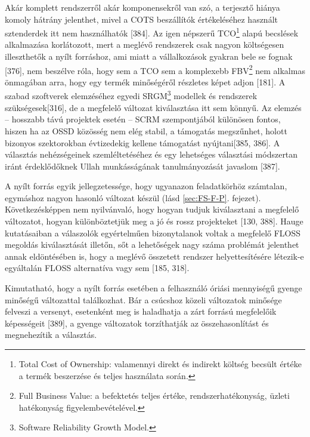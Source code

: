 \documentclass[12pt,magyar,a4paper,oneside]{scrreprt}
\begin{document}
Akár komplett rendszerről akár komponensekről van szó, a terjesztő
hiánya komoly hátrány jelenthet, mivel a COTS beszállítók értékeléséhez
használt sztenderdek itt nem használhatók {[}384{]}. Az igen népszerű
TCO\footnote{Total Cost of Ownership: valamennyi direkt és indirekt
  költség becsült értéke a termék beszerzése és teljes használata során.}
alapú becslések alkalmazása korlátozott, mert a meglévő rendszerek csak
nagyon költségesen illeszthetők a nyílt forráshoz, ami miatt a
vállalkozások gyakran bele se fognak {[}376{]}, nem beszélve róla, hogy
sem a TCO sem a komplexebb FBV\footnote{Full Business Value: a
  befektetés teljes értéke, rendszerhatékonyság, üzleti hatékonyság
  figyelembevételével.} nem alkalmas önmagában arra, hogy egy termék
minőségéről részletes képet adjon {[}181{]}. A szabad szoftverek
elemzéséhez egyedi SRGM\footnote{Software Reliability Growth Model.}
modellek és rendszerek szükségesek{[}316{]}, de a megfelelő változat
kiválasztása itt sem könnyű. Az elemzés -- hosszabb távú projektek
esetén -- SCRM szempontjából különösen fontos, hiszen ha az OSSD
közösség nem elég stabil, a támogatás megszűnhet, holott bizonyos
szektorokban évtizedekig kellene támogatást nyújtani{[}385, 386{]}. A
választás nehézségeinek szemléltetéséhez és egy lehetséges választási
módszertan iránt érdeklődőknek Ullah munkásságának tanulmányozását
javaslom {[}387{]}.

A nyílt forrás egyik jellegzetessége, hogy ugyanazon feladatkörhöz
számtalan, egymáshoz nagyon hasonló változat készül (lásd
\ref{sec:FS-F-P}. fejezet). Következésképpen nem nyilvánvaló, hogy
hogyan tudjuk kiválasztani a megfelelő változatot, hogyan különböztetjük
meg a jó és rossz projekteket {[}130, 388{]}. Hauge kutatásaiban a
válaszolók egyértelműen bizonytalanok voltak a megfelelő FLOSS megoldás
kiválasztását illetőn, sőt a lehetőségek nagy száma problémát jelenthet
annak eldöntésében is, hogy a meglévő összetett rendszer
helyettesítésére létezik-e egyáltalán FLOSS alternatíva vagy sem {[}185,
318{]}.

Kimutatható, hogy a nyílt forrás esetében a felhasználó óriási
mennyiségű gyenge minőségű változattal találkozhat. Bár a csúcshoz
közeli változatok minősége felveszi a versenyt, esetenként meg is
haladhatja a zárt forrású megfelelőik képességeit {[}389{]}, a gyenge
változatok torzíthatják az összehasonlítást és megnehezítik a választás.
\end{document}
